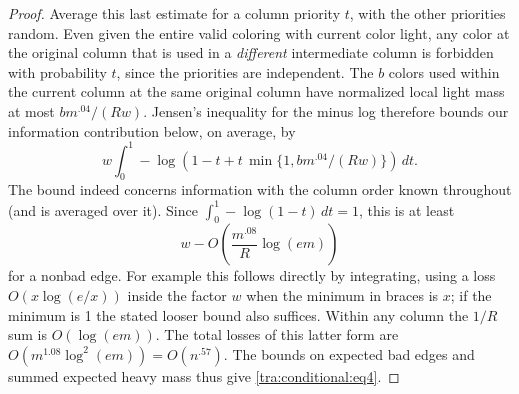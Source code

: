 \begin{proof}
Average this last estimate for a column priority \(t\), with the other priorities random. Even given the entire valid coloring with current color light, any color at the original column that is used in a \emph{different} intermediate column is forbidden with probability \(t\), since the priorities are independent. The \(b\) colors used within the current column at the same original column have normalized local light mass at most \(b m^{.04}/(Rw)\). Jensen's inequality for the minus log therefore bounds our information contribution below, on average, by
\[
                w\int_0^1 -\log\left(1-t+t\,\min\{1,bm^{.04}/(Rw)\}\right)\,dt .
\]
The bound indeed concerns information with the column order known throughout (and is averaged over it). Since \(\int_0^1-\log(1-t)\,dt=1\), this is at least
\[
                         w-O\left(\frac{m^{.08}}R\log(em)\right)
\]
for a nonbad edge. For example this follows directly by integrating, using a loss \(O(x\log(e/x))\) inside the factor \(w\) when the minimum in braces is \(x\); if the minimum is 1 the stated looser bound also suffices. Within any column the \(1/R\) sum is \(O(\log(em))\). The total losses of this latter form are \(O(m^{1.08}\log^2(em))=O(n^{.57})\). The bounds on expected bad edges and summed expected heavy mass thus give \eqref{tra:conditional:eq4}.

\end{proof}

